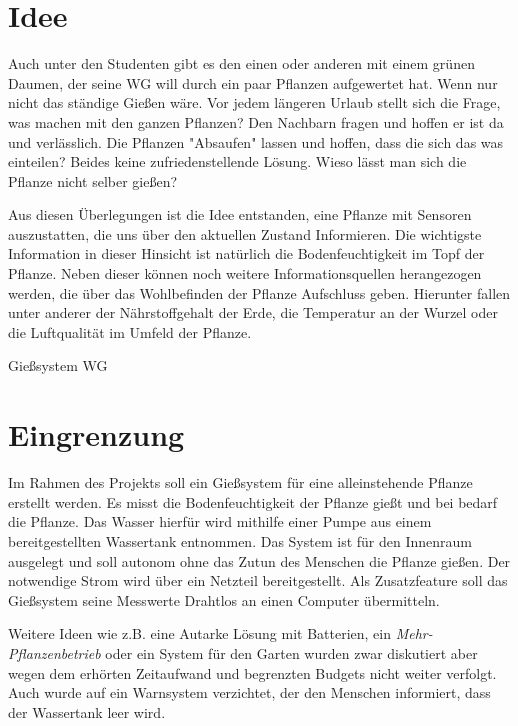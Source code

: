 \documentclass[]{IEEEtran}
\date{\today}
\begin{document}
\section{Idee}\label{refIdee}
Auch unter den Studenten gibt es den einen oder anderen mit einem grünen Daumen, der seine WG will durch ein paar Pflanzen aufgewertet hat. Wenn nur nicht das ständige Gießen wäre. Vor jedem längeren Urlaub stellt sich die Frage, was machen mit den ganzen Pflanzen? Den Nachbarn fragen und hoffen er ist da und verlässlich. Die Pflanzen "Absaufen" lassen und hoffen, dass die sich das was einteilen? Beides keine zufriedenstellende Lösung. Wieso lässt man sich die Pflanze nicht selber gießen?

Aus diesen Überlegungen ist die Idee entstanden, eine Pflanze mit Sensoren auszustatten, die uns über den aktuellen Zustand Informieren. Die wichtigste Information in dieser Hinsicht ist natürlich die Bodenfeuchtigkeit im Topf der Pflanze. Neben dieser können noch weitere Informationsquellen herangezogen werden, die über das Wohlbefinden der Pflanze Aufschluss geben. Hierunter fallen unter anderer der Nährstoffgehalt der Erde, die Temperatur an der Wurzel oder die Luftqualität im Umfeld der Pflanze.

Gießsystem WG


\section{Eingrenzung}
Im Rahmen des Projekts soll ein Gießsystem für eine alleinstehende Pflanze erstellt werden. Es misst die Bodenfeuchtigkeit der Pflanze gießt und bei bedarf die Pflanze. Das Wasser hierfür wird mithilfe einer Pumpe aus einem bereitgestellten Wassertank entnommen. Das System ist für den Innenraum ausgelegt und soll autonom ohne das Zutun des Menschen die Pflanze gießen. Der notwendige Strom wird über ein Netzteil bereitgestellt. Als Zusatzfeature soll das Gießsystem seine Messwerte Drahtlos an einen Computer übermitteln.
 
Weitere Ideen wie z.B. eine Autarke Lösung mit Batterien, ein \emph{Mehr-Pflanzenbetrieb} oder ein System für den Garten wurden zwar diskutiert aber wegen dem erhörten Zeitaufwand und begrenzten Budgets nicht weiter verfolgt. Auch wurde auf ein Warnsystem verzichtet, der den Menschen informiert, dass der Wassertank leer wird. 
\end{document}
